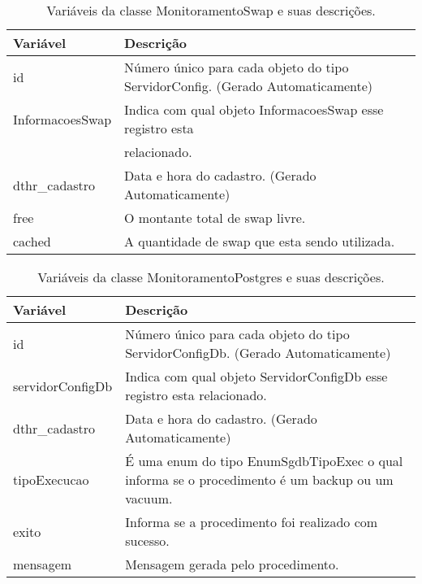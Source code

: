 \begin{table}[!ht]
\centering
\begin{tabular}{|l|l|}
\hline
{\color[HTML]{000000} \textbf{Variável}} & {\color[HTML]{000000} \textbf{Descrição}}                                      \\ \hline
id                                       & \multicolumn{1}{p{10.00cm}|}{Número único para cada objeto do tipo ServidorConfig. (Gerado Automaticamente)}\\ \hline
InformacoesSwap                          & Indica com qual objeto InformacoesSwap esse registro esta  \\
																				 & relacionado.         \\ \hline
dthr\_cadastro                           & Data e hora do cadastro. (Gerado Automaticamente)                              \\ \hline
free                                     & O montante total de swap livre.                                                \\ \hline
cached                                   & A quantidade de swap que esta sendo utilizada.                                 \\ \hline
\end{tabular}
\caption[Variáveis da classe MonitoramentoSwap e suas descrições.]{Variáveis da classe MonitoramentoSwap e suas descrições.}
\label{Tab:VariaveisMonitoramentoSwap}
\end{table}


\begin{table}[!ht]
\centering
\begin{tabular}{|l|l|}
\hline
{\color[HTML]{000000} \textbf{Variável}} & {\color[HTML]{000000} \textbf{Descrição}}\\ \hline
id                                       &  \multicolumn{1}{p{10.00cm}|}{Número único para cada objeto do tipo ServidorConfigDb. (Gerado Automaticamente)} \\ \hline
servidorConfigDb                         &  \multicolumn{1}{p{10.00cm}|}{Indica com qual objeto ServidorConfigDb esse registro esta relacionado.} \\ \hline
dthr\_cadastro                           &  \multicolumn{1}{p{10.00cm}|}{Data e hora do cadastro. (Gerado Automaticamente)} \\ \hline
tipoExecucao                             &  \multicolumn{1}{p{10.00cm}|}{É uma enum do tipo EnumSgdbTipoExec o qual informa se o procedimento é um backup ou um vacuum. }\\ \hline
exito                                    &  \multicolumn{1}{p{10.00cm}|}{Informa se a procedimento foi realizado com sucesso. }\\ \hline
mensagem                                 &  \multicolumn{1}{p{10.00cm}|}{Mensagem gerada pelo procedimento. }\\ \hline
\end{tabular}
\caption[Variáveis da classe MonitoramentoPostgres e suas descrições.]{Variáveis da classe MonitoramentoPostgres e suas descrições.}
\label{Tab:VariaveisMonitoramentoPostgres}
\end{table}

